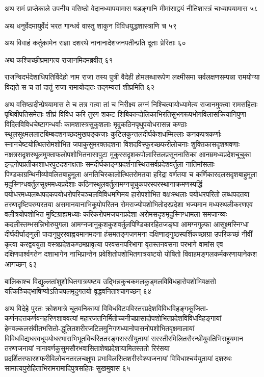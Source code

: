 अथ रामं प्राप्तेकाले उपनीय वसिष्ठो वेदानध्यापयामास षडङ्गानि मीमांसाद्वयं नीतिशास्त्रं
चाध्यापयामास ५८

अथ धनुर्वेदमायुर्वेदं भरत गान्धर्व वास्तु शाकुन विविधयुद्धशास्त्राणि च ५९

अथ विवाहं कर्तुकामेन राज्ञा दशरथे नानानादेशजनपतीन्प्रति दूताः प्रेरिताः ६०

अथ कश्चिच्छीघ्रमागत्य राजानमिदमब्रवीत् ६१

राजन्विदर्भदेशाधिपतिर्विदेहो नाम राजा तस्य पुत्री वैदेही होमलब्धारूपेण लक्ष्मीसमा
सर्वलक्षणसम्पन्ना रामयोग्या विद्यते स च तां दातुं राजा रामायोद्यतः तद्गम्यतां शीघ्रमिति
 ६२

अथ वसिष्ठादीन्प्रेषयामास ते च तत्र गत्वा तां च निरीक्ष्य लग्नं निश्चित्यायोध्यामेत्य
राजानमुक्त्वा रामसहिताः पृथिवीपतिसमेताः शीघ्रं विविध करि तुरग शकट
शिबिकान्दोलिकाभिरतिसुभगरूपभोगविलासक्रियानिपुणा विदितविविधचेष्टागन्धर्वाः
कामशास्त्रसुकुशलाः मृदुकठिनपृथुपयोधरासन्न कण्ठाः स्थूलसूक्ष्मललाटबिम्बदशनच्छदमुखपङ्कजाः
कुटिलकुन्तलदीर्घकेशधम्मिल्लाः कनकपत्रकर्णाः स्नानचेष्टयोत्थितरोमशोभित जपाकुसुमरक्तदशना
विशदविस्फुरच्छफरीलोचनाः शुक्तिकासदृशश्रवणाः नक्षत्रसदृशस्थूलमुक्ताफलोपशोभितनासापुटा
मुकुरसदृशकपोलास्तिलप्रसूननासिका आनम्रमध्यप्रदेशचूचुका इन्द्रगोपप्रतीकाशाधरपुटदशनक्षताः
समदीर्घकाङ्गप्रदर्शनास्थितसर्वप्रदेशवर्तुला नातिमांसलाः पिण्डकाग्रन्थिनीव्योवलितबाहुमूला
अनतिचिरकालोत्थितरोमतया हरिद्रा वर्णतया च कर्णिकारदलसदृशबाहुमूला
मृदुस्निग्धवर्तुलसूक्ष्ममध्यप्रदेशाः कठिनस्थूलवर्तुलामग्नचूचुकपरस्परस्थानाक्रमणस्पर्द्धि
पयोधरमध्यलब्धपदकपयोधरोपरिचञ्चलविविधमणिमय हारोपशोभित वक्षःस्थलाः पयोधरपरितो
लब्धपदतया तरुणदृष्टिपरम्परतया असमानयानाभिकूपोपरितन रोमराज्योपशोभितोदरप्रदेशा
भज्यमान मध्यस्थलीकरणएव वलीत्रयोपशोभित मुष्टिग्राह्यमध्याः करिकरोपमजघनप्रदेशा
अरोमसदृशमृदुस्निग्धामला समजान्व्यः कदलीस्तम्भसन्निभोरुयुगला
आमग्नजानुकृशकुशवर्तुलपिण्डिकारहितजङ्घा आमग्नगुल्फा आसूक्ष्मस्निग्धा दीर्घदीर्घाङ्गुली
पादानूपुररवाह्वयमानमदना हंसमतङ्गजगमना दक्षिणाङ्गुष्ठस्पर्शिकच्छाग्रा उपरिकच्छं नीवीं कृत्वा
करद्वययुता वस्त्रप्रदेशकण्ठमप्रावृत्या परवसनपरिभागा वृतस्तनवसना परभागे वामांस एव
दक्षिणपार्श्वगतेन दशाभागेन नाभिप्रान्तेन प्रवेशितोपशोभितगात्रयष्टयो योषितो
विवाहमङ्गलकर्मकरणायानेकश आगच्छन् ६३

बालिकाश्च विद्युल्लतांशुशोधितगात्रयष्टय उद्भिन्नकुचकमलकुड्मलविविधहारोपशोभिवक्षसो
यत्किञ्चिद्भाषिण्योऽतिचपलमृदुगतयो वृद्धवनिताश्चागच्छन् ६४

अथ विदेहे पुरतः क्रोशमात्रे चूतवनिकायां
विविधविटपविस्तरप्रदेशविविधविहङ्गकूजिता-कर्णनदत्तकर्णवनहरिणशाववत्यां
महारजतनिर्मितोच्चनीचप्रासादोपशोभितप्रदेशविविधविहङ्गायां
हेमवल्कलसंवीतभसितो-द्धूलितशरीरजटिलमुनिगणध्यानोपासनोपशोभितवृक्षमालायां
विविधविद्यधरवधूपयोधरभाराभिभूतविचरिततरङ्गसरसीयुतायां
सरस्तीरमिलितसैरन्ध्रीयुवतिभिराहूयमान तरुणजनायां
नानावर्णकुसुमसौरभवासिताशेषप्रदेशायामितस्ततो रिरंसया
प्रदर्शितस्फारशफरीविलोचनतरलचक्षुषा प्रभाविलसितशरीरवेश्याजनायां विविधाश्चर्ययुतायां
दशरथः सामात्यपुरोहिताभिरामरामादिपुत्रसहितः सुखमुवास ६५

